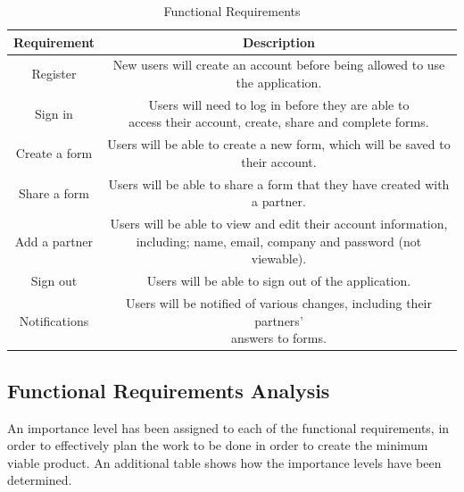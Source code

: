     \begin{table}[h]
        \centering
        \begin{tabular}{|c|c|}
            \hline
            Requirement & Description\\
            \hline
            \hline
            Register & \makecell{New users will create an account before being allowed to use\\the application.}\\
            \hline
            Sign in & \makecell{Users will need to log in before they are able to\\access their account, create, share and complete forms.}\\
            \hline
            Create a form & \makecell{Users will be able to create a new form, which will be saved to\\their account.}\\
            \hline
            Share a form & \makecell{Users will be able to share a form that they have created with\\a partner.}\\
            \hline
            Add a partner & \makecell{Users will be able to view and edit their account information,\\including; name, email, company and password (not viewable).}\\
            \hline
            Sign out & Users will be able to sign out of the application.\\
            \hline
            Notifications & \makecell{Users will be notified of various changes, including their partners'\\answers to forms.}\\
            \hline
        \end{tabular}
        \caption{Functional Requirements}
    \end{table}

    \subsection{Functional Requirements Analysis}
        An importance level has been assigned to each of the functional requirements, in order to effectively plan the work to be done in order to create the minimum viable product. An additional table shows how the importance levels have been determined.\\

